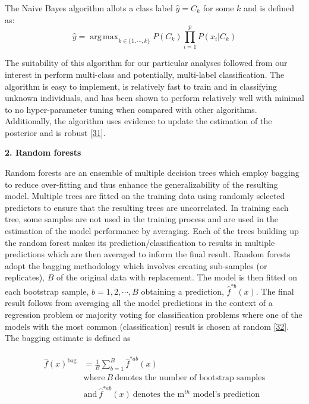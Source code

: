 \documentclass[
  10pt,
]{article}
\begin{document}
The Naive Bayes algorithm allots a class label \(\hat{y} = C_k\) for some \(k\) and is defined as:
\begin{equation}
    \hat{y} = \mathop{\mathrm{arg\,max}}_{k \in \{1, \cdots, k\}} P(C_k) \prod_{i = 1}^{p} P(x_i|C_k)
\end{equation}

The suitability of this algorithm for our particular analyses followed from our interest in perform multi-class and potentially, multi-label classification. The algorithm is easy to implement, is relatively fast to train and in classifying unknown individuals, and has been shown to perform relatively well with minimal to no hyper-parameter tuning when compared with other algorithms. Additionally, the algorithm uses evidence to update the estimation of the posterior and is robust {[}\protect\hyperlink{ref-Chen2021}{31}{]}.

\textbf{2. Random forests}

Random forests are an ensemble of multiple decision trees which employ bagging to reduce over-fitting and thus enhance the generalizability of the resulting model. Multiple trees are fitted on the training data using randomly selected predictors to ensure that the resulting trees are uncorrelated. In training each tree, some samples are not used in the training process and are used in the estimation of the model performance by averaging. Each of the trees building up the random forest makes its prediction/classification to results in multiple predictions which are then averaged to inform the final result. Random forests adopt the bagging methodology which involves creating sub-samples (or replicates), \(B\) of the original data with replacement. The model is then fitted on each bootstrap sample, \(b = 1, 2, \cdots, B\) obtaining a prediction, \(\hat{f}^{*b}(x)\). The final result follows from averaging all the model predictions in the context of a regression problem or majority voting for classification problems where one of the models with the most common (classification) result is chosen at random {[}\protect\hyperlink{ref-James2013}{32}{]}. The bagging estimate is defined as

\begin{align}
    \begin{split}
        \hat{f}(x)^{\textrm{bag}} &= \frac{1}{B} \sum_{b=1}^{B} \hat{f}^{*ab}(x) \\
        & \textrm{where} ~ B ~ \textrm{denotes the number of bootstrap samples} \\
        & \textrm{and} ~ \hat{f}^{*ab}(x) ~ \textrm{denotes the m$^{th}$ model's prediction} \\
    \end{split}
\end{align}
\end{document}
